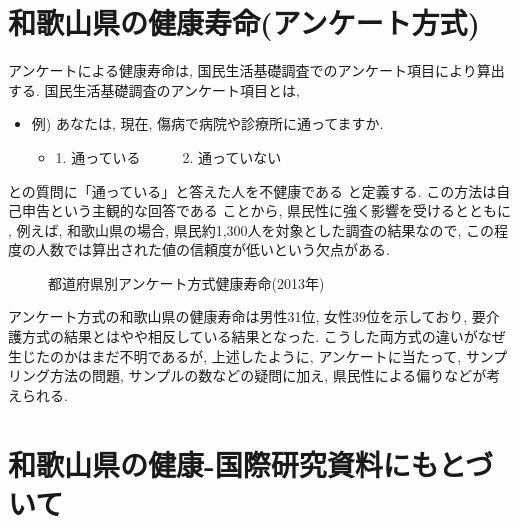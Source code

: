\section{和歌山県の健康寿命(アンケート方式)}
アンケートによる健康寿命は,
国民生活基礎調査でのアンケート項目により算出する.
国民生活基礎調査のアンケート項目とは,

\begin{itemize} \setlength{\itemsep}{-0.5mm} \setlength{\parskip}{-0.5mm}
	\item  例) あなたは, 現在, 傷病で病院や診療所に通ってますか.
	      \begin{itemize} \setlength{\itemsep}{-0.5mm} \setlength{\parskip}{-0.5mm}
		      \item 1. 通っている~~~~~~2. 通っていない
	      \end{itemize}
\end{itemize}
との質問に「通っている」と答えた人を不健康である
と定義する.
この方法は自己申告という主観的な回答である
ことから, 県民性に強く影響を受けるとともに
, 例えば, 和歌山県の場合, 県民約1,300人を対象とした調査の結果なので, この程度の人数では算出された値の信頼度が低いという欠点がある.

\begin{figure}[h!]
	\begin{center}
		\caption{都道府県別アンケート方式健康寿命(2013年)}\label{fig1}
	\end{center}
\end{figure}

アンケート方式の和歌山県の健康寿命は男性31位, 女性39位を示しており, 要介護方式の結果とはやや相反している結果となった.
こうした両方式の違いがなぜ生じたのかはまだ不明であるが, 上述したように, アンケートに当たって, サンプリング方法の問題,
サンプルの数などの疑問に加え, 県民性による偏りなどが考えられる.
\section{和歌山県の健康-国際研究資料にもとづいて}




